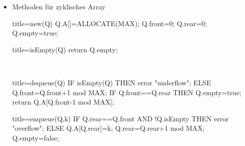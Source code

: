 \documentclass[
    12pt,
    a4paper,
    ngerman,
    color=3b,%
    marginpar=false,
    colorback=false,
    leqno,
]{tudaexercise}
\begin{document}
\begin{itemize}
\begin{itemize}
              \item Methoden für zyklisches Array\\
                    \begin{minipage}[t]{.45\textwidth}
                        \begin{codeBlock}[autogobble]{title={new(Q)}}
                            Q.A[]=ALLOCATE(MAX);
                            Q.front=0;
                            Q.rear=0;
                            Q.empty=true;
                        \end{codeBlock}
                    \end{minipage}
                    \begin{minipage}[t]{.45\textwidth}
                        \begin{codeBlock}[autogobble]{title={isEmpty(Q)}}
                            return Q.empty;
                        \end{codeBlock}
                    \end{minipage}
                    \\
                    \begin{minipage}[t]{.45\textwidth}
                        \begin{codeBlock}[autogobble]{title={dequeue(Q)}}
                            IF isEmpty(Q) THEN
                                error "underflow";
                            ELSE
                                Q.front=Q.front+1 mod MAX;
                                IF Q.front==Q.rear THEN
                                    Q.empty=true;
                                return Q.A[Q.front-1 mod MAX];
                        \end{codeBlock}
                    \end{minipage}
                    \begin{minipage}[t]{.45\textwidth}
                        \begin{codeBlock}[autogobble]{title={enqueue(Q,k)}}
                            IF Q.rear==Q.front AND !Q.isEmpty
                            THEN error "overflow";
                            ELSE
                                Q.A[Q.rear]=k;
                                Q.rear=Q.rear+1 mod MAX;
                                Q.empty=false;
                        \end{codeBlock}
                    \end{minipage}
          \end{itemize}


\end{itemize}
\end{document}
